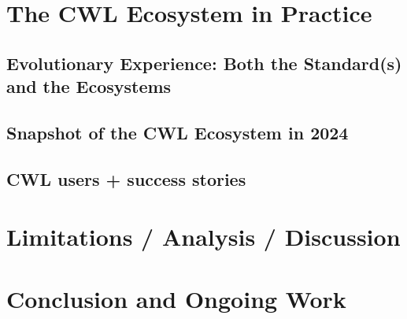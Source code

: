 \section{The CWL Ecosystem in Practice}
\subsection{Evolutionary Experience: Both the Standard(s) and the Ecosystems}
\subsection{Snapshot of the CWL Ecosystem in 2024}
\subsection{CWL users + success stories}

\section{Limitations / Analysis / Discussion}

\section{Conclusion and Ongoing Work}




